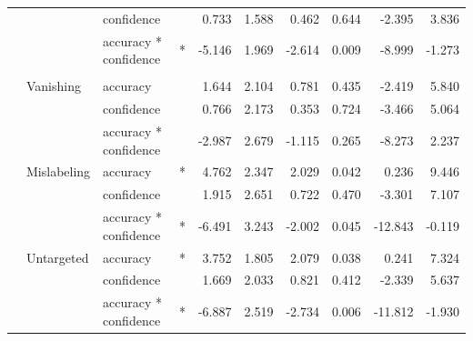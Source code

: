 \begin{longtable}[t]{llllrrrrrr}
\cmidrule{3-10}\nopagebreak
\hspace{1em} &  & confidence &  & 0.733 & 1.588 & 0.462 & 0.644 & -2.395 & 3.836\\
\cmidrule{3-10}\nopagebreak
\hspace{1em} &  & accuracy * confidence & * & -5.146 & 1.969 & -2.614 & 0.009 & -8.999 & -1.273\\
\cmidrule{1-10}\pagebreak[0]
\addlinespace[0.3em]
\multicolumn{10}{l}{\textbf{Cascade R-CNN}}\\
\hspace{1em} & Vanishing & accuracy &  & 1.644 & 2.104 & 0.781 & 0.435 & -2.419 & 5.840\\
\cmidrule{3-10}\nopagebreak
\hspace{1em} &  & confidence &  & 0.766 & 2.173 & 0.353 & 0.724 & -3.466 & 5.064\\
\cmidrule{3-10}\nopagebreak
\hspace{1em} &  & accuracy * confidence &  & -2.987 & 2.679 & -1.115 & 0.265 & -8.273 & 2.237\\
\cmidrule{2-10}\nopagebreak
\hspace{1em} & Mislabeling & accuracy & * & 4.762 & 2.347 & 2.029 & 0.042 & 0.236 & 9.446\\
\cmidrule{3-10}\nopagebreak
\hspace{1em} &  & confidence &  & 1.915 & 2.651 & 0.722 & 0.470 & -3.301 & 7.107\\
\cmidrule{3-10}\nopagebreak
\hspace{1em} &  & accuracy * confidence & * & -6.491 & 3.243 & -2.002 & 0.045 & -12.843 & -0.119\\
\cmidrule{2-10}\nopagebreak
\hspace{1em} & Untargeted & accuracy & * & 3.752 & 1.805 & 2.079 & 0.038 & 0.241 & 7.324\\
\cmidrule{3-10}\nopagebreak
\hspace{1em} &  & confidence &  & 1.669 & 2.033 & 0.821 & 0.412 & -2.339 & 5.637\\
\cmidrule{3-10}\nopagebreak
\hspace{1em} &  & accuracy * confidence & * & -6.887 & 2.519 & -2.734 & 0.006 & -11.812 & -1.930\\
\bottomrule
\end{longtable}
\endgroup{}

